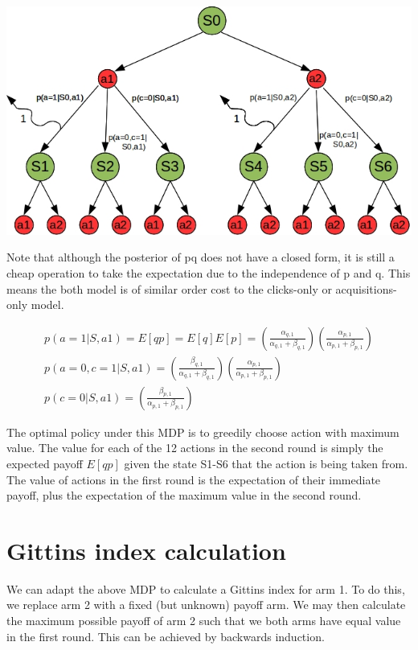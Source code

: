 \documentclass[11pt,a4,singlespacing,titlepagenumber=on]{scrreprt}
\numberwithin{equation}{chapter} %
\theoremstyle{remark}
\begin{document}
\includegraphics[scale=0.6]{BAMDP.jpg}

Note that although the posterior of pq does not have a closed form, it is still a cheap operation to take the expectation due to the independence of p and q. This means the both model is of similar order cost to the clicks-only or acquisitions-only model.

\begin{align}
	p(a=1|S,a1) = E[qp] = E[q]E[p] = 
		\left( \frac{ \alpha_{q,1} }{ \alpha_{q,1} + \beta_{q,1} } \right)
		\left( \frac{ \alpha_{p,1} }{ \alpha_{p,1} + \beta_{p,1} } \right) \\
	p(a=0,c=1|S,a1) = 
		\left( \frac{ \beta_{q,1} }{ \alpha_{q,1} + \beta_{q,1} } \right)
		\left( \frac{ \alpha_{p,1} }{ \alpha_{p,1} + \beta_{p,1} } \right) \\
	p(c=0|S,a1) = 
		\left( \frac{ \beta_{p,1} }{ \alpha_{p,1} + \beta_{p,1} } \right) 
\end{align}	

The optimal policy under this MDP is to greedily choose action with maximum value. The value for each of the 12 actions in the second round is simply the expected payoff $E[qp]$ given the state S1-S6 that the action is being taken from. The value of actions in the first round is the expectation of their immediate payoff, plus the expectation of the maximum value in the second round.

\section{Gittins index calculation}

We can adapt the above MDP to calculate a Gittins index for arm 1. To do this, we replace arm 2 with a fixed (but unknown) payoff arm. We may then calculate the maximum possible payoff of arm 2 such that we both arms have equal value in the first round. This can be achieved by backwards induction.
\end{document}
